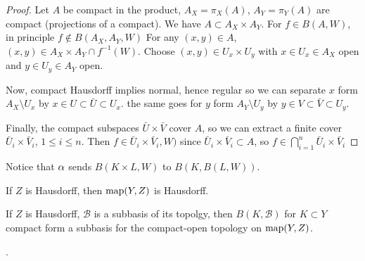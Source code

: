     \begin{proof}
        Let $A$ be compact in the product, $A_X = \pi_X(A)$,
        $A_Y = \pi_Y(A)$ are compact (projections of a compact).
        We have $A \subset A_X \times A_Y$.
        For $f \in B(A, W)$, in principle $f \notin B(A_X, A_Y, W)$
        For any $(x, y) \in A$, $(x, y) \in A_X \times A_Y \cap f^{-1}(W)$.
        Choose $(x, y) \in U_x \times U_y$ with
        $x \in U_x \in A_X$ open
        and
        $y \in U_y \in A_Y$ open.

        Now, compact Hausdorff implies normal, hence regular so 
        we can separate $x$ form $A_X \setminus U_x$ by $x \in U \subset \bar{U} \subset U_x$.
        the same goes for $y$ form $A_Y \setminus U_y$ by $y \in V \subset \bar{V} \subset U_y$.

        Finally, the compact subspaces $\bar{U} \times \bar{V}$ cover $A$, so we can extract
        a finite cover $
            \bar{U}_i \times \bar{V}_i
        $, $1 \leq i \leq n$.
        Then $f \in \bar{U}_i \times \bar{V}_i, W)$
        since $ \bar{U}_i \times \bar{V}_i \subset A$, so
        $f \in \bigcap_{i = 1}^n \bar{U}_i \times \bar{V}_i$
    \end{proof}

    Notice that $\alpha$ sends $B(K \times L, W)$ to $B(K, B(L, W))$.

    \begin{lemma}
        If $Z$ is Hausdorff, then $\operatorname{map}(Y, Z)$ is Hausdorff.
    \end{lemma}

    \begin{lemma}
        If $Z$ is Hausdorff, $\mathcal{B}$ is a subbasis of its topolgy,
        then $B(K, \mathcal{B})$ for $K \subset Y$ compact form a 
        subbasis for the compact-open topology on $\operatorname{map}(Y, Z)$.
    \end{lemma}



    \newpage
    .

